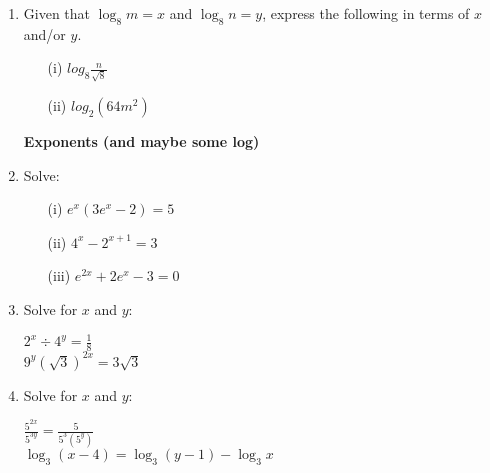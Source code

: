 \documentclass[14pt]{extarticle}
\begin{document}
\begin{flushleft}
\begin{enumerate}
\begin{enumerate}
    \end{enumerate}
\vspace{0.2 in}

\item Given that $\log_8 m = x$ and $\log_8 n = y$, express the following in terms of $x$ and/or $y$.
    \begin{enumerate}
        \item [(i)] $log_8 \frac{n}{\sqrt{8}}$
        \item [(ii)] $log_2 \left(64 m^2 \right)$
    \end{enumerate}
\vspace{0.4 in}


\textbf{Exponents (and maybe some log)}

\item Solve: 
    \begin{enumerate}
        \item [(i)] $e^x \left( 3 e^x -2 \right) = 5$
        \item [(ii)] $4^x - 2^{x+1}  = 3$
        \item [(iii)] $e^{2x} + 2e^x -3 =0$
    \end{enumerate}
    \vspace{0.2 in}

\item Solve for $x$ and $y$:
    \begin{center}
        $2^x \div 4^y = \frac{1}{8}$\\
        \vspace{0.1 in}
        $9^y \left(\sqrt{3}\right)^{2x} = 3 \sqrt{3}$
    \end{center}
\vspace{0.2 in}

\item Solve for $x$ and $y$:
    \begin{center}
        $\frac{5^{2x}}{5^{3y}} = \frac{5}{5^3 \left(5^y \right)}$ \\ 
        \vspace{0.1 in}
        $\log_3\left(x-4\right) = \log_3\left(y-1\right) - \log_3x $
    \end{center}
\vspace{0.2 in}
    
\end{enumerate}
\end{flushleft}
\end{document}
